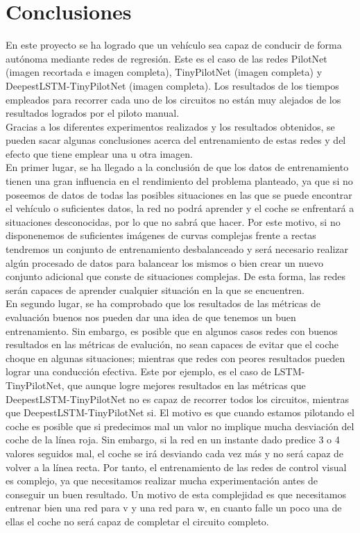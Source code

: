 \section{Conclusiones}

En este proyecto se ha logrado que un vehículo sea capaz de conducir de forma autónoma mediante redes de regresión. Este es el caso de las redes PilotNet (imagen recortada e imagen completa), TinyPilotNet (imagen completa) y DeepestLSTM-TinyPilotNet (imagen completa). Los resultados de los tiempos empleados para recorrer cada uno de los circuitos no están muy alejados de los resultados logrados por el piloto manual.\\

Gracias a los diferentes experimentos realizados y los resultados obtenidos, se pueden sacar algunas conclusiones acerca del entrenamiento de estas redes y del efecto que tiene emplear una u otra imagen.\\

En primer lugar, se ha llegado a la conclusión de que los datos de entrenamiento tienen una gran influencia en el rendimiento del problema planteado, ya que si no poseemos de datos de todas las posibles situaciones en las que se puede encontrar el vehículo o suficientes datos, la red no podrá aprender y el coche se enfrentará a situaciones desconocidas, por lo que no sabrá que hacer. Por este motivo, si no disponenemos de suficientes imágenes de curvas complejas frente a rectas tendremos un conjunto de entrenamiento desbalanceado y será necesario realizar algún procesado de datos para balancear los mismos o bien crear un nuevo conjunto adicional que conste de situaciones complejas. De esta forma, las redes serán capaces de aprender cualquier situación en la que se encuentren.\\

En segundo lugar, se ha comprobado que los resultados de las métricas de evaluación buenos nos pueden dar una idea de que tenemos un buen entrenamiento. Sin embargo, es posible que en algunos casos redes con buenos resultados en las métricas de evalución, no sean capaces de evitar que el coche choque en algunas situaciones; mientras que redes con peores resultados pueden lograr una conducción efectiva. Este por ejemplo, es el caso de LSTM-TinyPilotNet, que aunque logre mejores resultados en las métricas que DeepestLSTM-TinyPilotNet no es capaz de recorrer todos los circuitos, mientras que DeepestLSTM-TinyPilotNet si. El motivo es que cuando estamos pilotando el coche es posible que si predecimos mal un valor no implique mucha desviación del coche de la línea roja. Sin embargo, si la red en un instante dado predice 3 o 4 valores seguidos mal, el coche se irá desviando cada vez más y no será capaz de volver a la línea recta. Por tanto, el entrenamiento de las redes de control visual es complejo, ya que necesitamos realizar mucha experimentación antes de conseguir un buen resultado. Un motivo de esta complejidad es que necesitamos entrenar bien una red para v y una red para w, en cuanto falle un poco una de ellas el coche no será capaz de completar el circuito completo.\\

